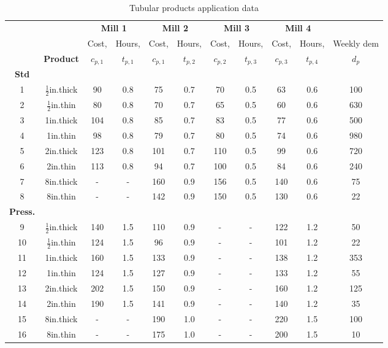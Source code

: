 \documentclass[a4paper,10 pt,titlepage,twoside]{book}
\theoremstyle{plain}
\theoremstyle{definition}
\theoremstyle{remark}
\begin{document}
\begin{center}
\begin{table}[]
	\begin{tabular}{ccccccccccc}
		\hline
		& \textbf{} & \multicolumn{2}{c}{\textbf{Mill 1}} & \multicolumn{2}{c}{\textbf{Mill 2}} & \multicolumn{2}{c}{\textbf{Mill 3}} & \multicolumn{2}{c}{\textbf{Mill 4}} & \textbf{} \\
		&  & Cost, & Hours, & Cost, & Hours, & Cost, & Hours, & Cost, & Hours, & Weekly dem \\ \cline{3-10}
		& \textbf{Product} & \textbf{$c_{p,1}$} & \textbf{$t_{p,1}$} & \textbf{$c_{p,1}$} & \textbf{$t_{p,2}$} & \textbf{$c_{p,2}$} & \textbf{$t_{p,3}$} & \textbf{$c_{p,3}$} & \textbf{$t_{p,4}$} & \textbf{$d_{p}$} \\ \hline
		\textbf{Std} &  &  &  &  &  &  &  &  &  &  \\ \cline{1-1}
		1 & $\frac{1}{2}$in.thick & 90 & 0.8 & 75 & 0.7 & 70 & 0.5 & 63 & 0.6 & 100 \\
		2 & $\frac{1}{2}$in.thin & 80 & 0.8 & 70 & 0.7 & 65 & 0.5 & 60 & 0.6 & 630 \\
		3 & 1in.thick & 104 & 0.8 & 85 & 0.7 & 83 & 0.5 & 77 & 0.6 & 500 \\
		4 & 1in.thin & 98 & 0.8 & 79 & 0.7 & 80 & 0.5 & 74 & 0.6 & 980 \\
		5 & 2in.thick & 123 & 0.8 & 101 & 0.7 & 110 & 0.5 & 99 & 0.6 & 720 \\
		6 & 2in.thin & 113 & 0.8 & 94 & 0.7 & 100 & 0.5 & 84 & 0.6 & 240 \\
		7 & 8in.thick & - & - & 160 & 0.9 & 156 & 0.5 & 140 & 0.6 & 75 \\
		8 & 8in.thin & - & - & 142 & 0.9 & 150 & 0.5 & 130 & 0.6 & 22 \\ \hline
		\textbf{Press.} &  &  &  &  &  &  &  &  &  &  \\ \cline{1-1}
		9 & $\frac{1}{2}$in.thick & 140 & 1.5 & 110 & 0.9 & - & - & 122 & 1.2 & 50 \\
		10 & $\frac{1}{2}$in.thin & 124 & 1.5 & 96 & 0.9 & - & - & 101 & 1.2 & 22 \\
		11 & 1in.thick & 160 & 1.5 & 133 & 0.9 & - & - & 138 & 1.2 & 353 \\
		12 & 1in.thin & 124 & 1.5 & 127 & 0.9 & - & - & 133 & 1.2 & 55 \\
		13 & 2in.thick & 202 & 1.5 & 150 & 0.9 & - & - & 160 & 1.2 & 125 \\
		14 & 2in.thin & 190 & 1.5 & 141 & 0.9 & - & - & 140 & 1.2 & 35 \\
		15 & 8in.thick & - & - & 190 & 1.0 & - & - & 220 & 1.5 & 100 \\
		16 & 8in.thin & - & - & 175 & 1.0 & - & - & 200 & 1.5 & 10 \\ \hline
	\end{tabular}\caption{\label{tab:TP}Tubular products application data}
\end{table}
\end{center}
\end{document}
